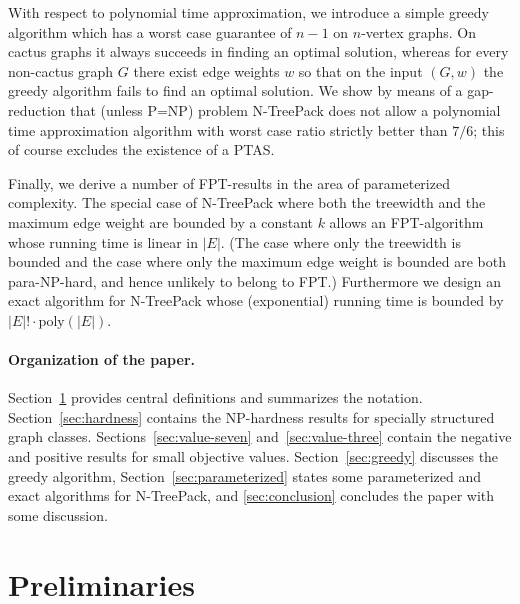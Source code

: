 \documentclass[runningheads]{llncs}
\newcommand{\xxxNTP}{{\sc N-TreePack}}
\begin{document}
With respect to polynomial time approximation, we introduce a simple greedy algorithm
which has a worst case guarantee of $n-1$ on $n$-vertex graphs.
On cactus graphs it always succeeds in finding an optimal solution, whereas for every 
non-cactus graph $G$ there exist edge weights $w$ so that on the input $(G,w)$ the 
greedy algorithm fails to find an optimal solution.
We show by means of a gap-reduction that (unless P=NP) problem {\xxxNTP} does not
allow a polynomial time approximation algorithm with worst case ratio strictly better
than $7/6$; this of course excludes the existence of a PTAS.

Finally, we derive a number of FPT-results in the area of parameterized complexity.
The special case of {\xxxNTP} where both the treewidth and the maximum edge weight are 
bounded by a constant $k$ allows an FPT-algorithm whose running time is linear in $|E|$.
(The case where only the treewidth is bounded and the case where only the maximum 
edge weight is bounded are both para-NP-hard, and hence unlikely to belong to FPT.)
Furthermore we design an exact algorithm for {\xxxNTP} whose (exponential) 
running time is bounded by $|E|!\cdot\text{poly}(|E|)$.

\paragraph{Organization of the paper.}
Section~\ref{sec:notation} provides central definitions and summarizes the notation.
Section~\ref{sec:hardness} contains the NP-hardness results for specially structured graph classes. 
Sections~\ref{sec:value-seven} and~\ref{sec:value-three} contain the negative and positive results 
for small objective values. 
Section~\ref{sec:greedy} discusses the greedy algorithm, 
Section~\ref{sec:parameterized} states some parameterized and exact algorithms for {\xxxNTP}, and
\cref{sec:conclusion} concludes the paper with some discussion.


\section{Preliminaries}
\label{sec:notation}
\end{document}

